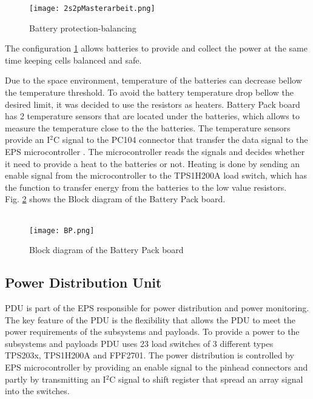   \begin{figure}[h]
  	\centering
  	\texttt{[image: 2s2pMasterarbeit.png]}
  	\caption{Battery protection-balancing}
  	\label{fig: Bat_prot_bal}
  \end{figure}
  
  The configuration \ref{fig: Bat_prot_bal} allows batteries to provide and collect the power at the same time keeping cells balanced and safe.
  
  Due to the space environment, temperature of the batteries can decrease bellow the temperature threshold. To avoid the battery temperature drop bellow the desired limit, it was decided to use the resistors as heaters. Battery Pack board has 2 temperature sensors that are located under the batteries, which allows to measure the temperature close to the the batteries. The temperature sensors provide an I$^{2}$C signal to the PC104 connector that transfer the data signal to the EPS microcontroller . The microcontroller reads the signals and decides whether it need to provide a heat to the batteries or not. Heating is done by sending an enable signal from the microcontroller to the TPS1H200A load switch, which has the function to transfer energy from the batteries to the low value resistors.  \\ 
   Fig. \ref{fBP} shows the Block diagram of the Battery Pack board. \\ \\ 
  
  
  \begin{figure}[h]
  	\centering
  	\texttt{[image: BP.png]}
  	\caption{Block diagram of the Battery Pack board}
  	\label{fBP}
  \end{figure} 
   
  
  \subsection{Power Distribution Unit}
  PDU is part of the EPS responsible for power distribution and power monitoring. The key feature of the PDU is the flexibility that allows the PDU to meet the power requirements of the subsystems and payloads. To provide a power to the subsystems and payloads PDU uses 23 load switches of 3 different types TPS203x, TPS1H200A and FPF2701. The power distribution is controlled by EPS microcontroller by providing an enable signal to the pinhead connectors and partly by transmitting an I$^2$C signal to shift register that spread an array signal into the switches. 
  
